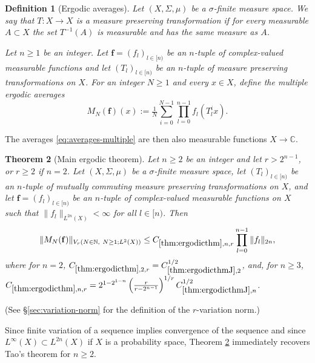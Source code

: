 \documentclass[12pt,reqno]{amsart}
\theoremstyle{plain}
\newtheorem{theorem}{Theorem}[section]
\newtheorem{definition}[theorem]{Definition}
\numberwithin{equation}{section}
\theoremstyle{remark}
\newcommand{\uses}[1]{}
\newcommand{\usesdefs}[1]{}
\newcommand{\N}{{\mathbb N}}
\newcommand{\C}{{\mathbb C}}
\begin{document}
\begin{definition}[Ergodic averages]\label{ergodic averages}\uses{}\usesdefs{}
Let $(X,\Sigma,\mu)$ be a $\sigma$-finite measure space. We say that $T: X \to X$ is a measure preserving transformation if for every measurable $A\subset X$ the set $T^{-1}(A)$ is measurable and has the
same measure as $A$.

Let $n\geq 1$ be an integer. Let $\mathbf{f}=(f_l)_{l\in [n)}$ be an $n$-tuple of complex-valued measurable functions  and let $(T_l)_{l\in [n)}$ be an $n$-tuple of measure preserving transformations on $X$. For an integer $N\geq 1$ and every $x\in X$, define the multiple ergodic averages
\begin{equation}\label{eq:averages-multiple}
M_{N}(\mathbf{f})(x) := \tfrac{1}{N}\sum_{i=0}^{N-1} \prod_{l=0}^{n-1} f_l(T_l^i x).
\end{equation}
\end{definition}


The averages \eqref{eq:averages-multiple} are then also measurable functions $X\to \C$.

\begin{theorem}[Main ergodic theorem]\label{thm:ergodicthm}\uses{thm:ergodicthmJ,jump estimates imply variation}\usesdefs{ergodic averages}
Let $n\ge 2$ be an integer and let $r>2^{n-1}$, or $r\ge 2$ if $n=2$. Let $(X,\Sigma,\mu)$ be a $\sigma$-finite measure space, let $(T_l)_{l\in [n)}$ be an $n$-tuple of mutually commuting measure preserving transformations on $X$, and let $\mathbf{f}=(f_l)_{l\in [n)}$ be an $n$-tuple of complex-valued measurable functions on $X$ such that $\|f_l\|_{L^{2n}(X)}<\infty$ for all $l\in[n)$. Then
\begin{equation}\label{main ergodic variation estimate}
 \| M_{N} (\mathbf{f}) \|_{V_{r}(N\in\N,\ N\ge1; L^2(X))}
\le C_{\ref{thm:ergodicthm},n,r}
 \prod_{l=0}^{n-1} \|f_l\|_{2n},
\end{equation}
where for $n=2$,
$C_{\ref{thm:ergodicthm},2,r}=C_{\ref{thm:ergodicthmJ},2}^{1/2}$,\label{main ergodic theorem constant}
and, for $n\ge3$,
$C_{\ref{thm:ergodicthm},n,r}=2^{1-2^{1-n}}\left(\tfrac{r}{r-2^{n-1}}\right)^{1/r}C_{\ref{thm:ergodicthmJ},n}^{1/2}$.\label{auto:main-ergodic-theorem-constant-higher-rank}
\end{theorem}
(See \S \ref{sec:variation-norm} for the definition of the $r$-variation norm.)

Since finite variation of a sequence implies convergence of the sequence and since $L^\infty(X)\subset L^{2n}(X)$ if $X$ is a probability space, Theorem \ref{thm:ergodicthm} immediately recovers Tao's theorem  \cite[Theorem 1.1]{Tao07} for $n\ge 2$.
\end{document}
